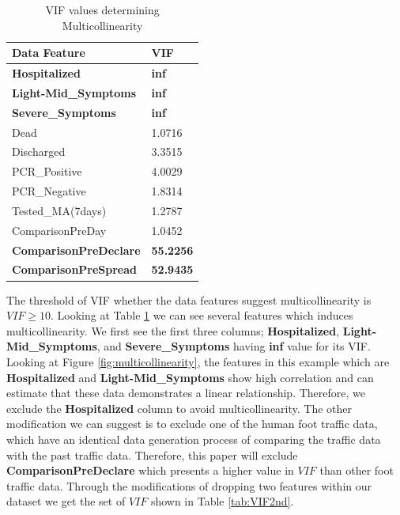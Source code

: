 \begin{table}[h]
\centering
\caption{\label{tab:VIF1st}VIF values determining Multicollinearity}
\begin{tabular}{ |p{5cm}||p{2cm}| }
 \hline
    Data Feature &  VIF\\
 \hline
\textbf{Hospitalized} & \textbf{inf} \\
\textbf{Light-Mid\_Symptoms} & \textbf{inf} \\
\textbf{Severe\_Symptoms} & \textbf{inf} \\
Dead & 1.0716 \\
Discharged & 3.3515 \\
PCR\_Positive & 4.0029 \\
PCR\_Negative & 1.8314 \\
Tested\_MA(7days) & 1.2787 \\
ComparisonPreDay & 1.0452 \\
\textbf{ComparisonPreDeclare} & \textbf{55.2256} \\
\textbf{ComparisonPreSpread} & \textbf{52.9435} \\
 \hline
\end{tabular}
\end{table}

The threshold of VIF whether the data features suggest multicollinearity is $VIF\geq 10$. Looking at Table \ref{tab:VIF1st} we can see several features which induces multicollinearity. We first see the first three columns; \textbf{Hospitalized}, \textbf{Light-Mid\_Symptoms}, and \textbf{Severe\_Symptoms} having \textbf{inf} value for its VIF. Looking at Figure \ref{fig:multicollinearity}, the features in this example which are \textbf{Hospitalized} and  \textbf{Light-Mid\_Symptoms} show high correlation and can estimate that these data demonstrates a linear relationship. Therefore, we exclude the \textbf{Hospitalized} column to avoid multicollinearity. The other modification we can suggest is to exclude one of the human foot traffic data, which have an identical data generation process of comparing the traffic data with the past traffic data. Therefore, this paper will exclude \textbf{ComparisonPreDeclare} which presents a higher value in $VIF$ than other foot traffic data. Through the modifications of dropping two features within our dataset we get the set of $VIF$ shown in Table \ref{tab:VIF2nd}.

